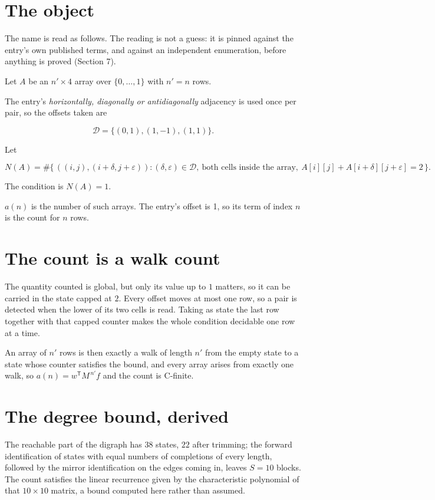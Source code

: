 \documentclass[11pt]{article}
\theoremstyle{definition}
\begin{document}
\section{The object}

The name is read as follows. The reading is not a guess: it is pinned against the entry's own published terms, and against an independent enumeration, before anything is proved (Section 7).

Let $A$ be an $n' \times 4$ array over $\{0,\dots,1\}$ with $n' = n$ rows.

The entry's {\itshape horizontally, diagonally or antidiagonally} adjacency is used once per pair, so the offsets taken are

\[\mathcal{D} = \{(0,1), (1,-1), (1,1)\}.\]

Let

\[N(A) = \#\bigl\{\,((i,j),(i{+}\delta,j{+}\varepsilon)) : (\delta,\varepsilon) \in \mathcal{D},\ \text{both cells inside the array},\ A[i][j] + A[i{+}\delta][j{+}\varepsilon] = 2\,\bigr\}.\]

The condition is $N(A) = 1$.

$a(n)$ is the number of such arrays. The entry's offset is 1, so its term of index $n$ is the count for $n$ rows.

\section{The count is a walk count}

The quantity counted is global, but only its value up to $1$ matters, so it can be carried in the state capped at $2$. Every offset moves at most one row, so a pair is detected when the lower of its two cells is read. Taking as state the last row together with that capped counter makes the whole condition decidable one row at a time.

An array of $n'$ rows is then exactly a walk of length $n'$ from the empty state to a state whose counter satisfies the bound, and every array arises from exactly one walk, so $a(n) = w^{\mathsf T}M^{\,n'}f$ and the count is C-finite.

\section{The degree bound, derived}

The reachable part of the digraph has $38$ states, $22$ after trimming; the forward identification of states with equal numbers of completions of every length, followed by the mirror identification on the edges coming in, leaves $S = 10$ blocks. The count satisfies the linear recurrence given by the characteristic polynomial of that $10\times10$ matrix, a bound computed here rather than assumed.
\end{document}
